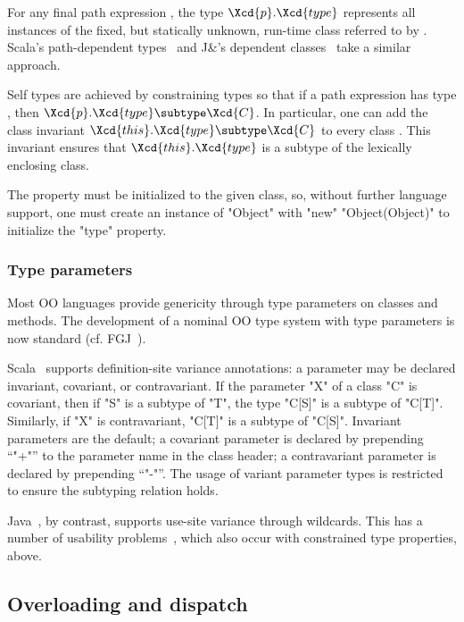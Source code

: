 \noindent
For any final path expression , the type
$\Xcd{p}.\Xcd{type}$ represents all instances of the fixed,
but statically unknown, run-time class referred to by .
Scala's path-dependent types~\cite{scala-book} and J\&'s
dependent classes~\cite{nqm06}
take a similar approach.

Self types are achieved by
constraining types so that if a path expression 
has type , then
$\Xcd{p}.\Xcd{type} \subtype \Xcd{C}$.
In particular, one can add the class invariant
$\Xcd{this}.\Xcd{type} \subtype \Xcd{C}$ to every class .
This invariant ensures that
$\Xcd{this}.\Xcd{type}$ is a subtype
of the lexically enclosing class.

The property must be initialized to the given class, so, without
further language support, one must create an instance of
\xcd"Object" with \xcd"new" \xcd"Object(Object)" to initialize
the \xcd"type" property.

\subsubsection{Type parameters}

Most OO languages provide genericity through type parameters on
classes and methods.  The development of a nominal OO type
system with type parameters is now standard (cf.  FGJ~\cite{FJ}).

Scala~\cite{scala} supports definition-site variance
annotations:
a parameter may be declared invariant, covariant, or
contravariant.
If the parameter \xcd"X" of a class \xcd"C" is covariant,
then if \xcd"S" is a subtype of
\xcd"T", the type \xcd"C[S]" is a subtype of \xcd"C[T]".
Similarly, if \xcd"X" is contravariant,
\xcd"C[T]" is a subtype of \xcd"C[S]".
Invariant parameters are the default; a covariant parameter is
declared by prepending ``\xcd"+"'' to the parameter name in the
class header; a contravariant parameter is declared by
prepending ``\xcd"-"''.  The usage of variant parameter types is
restricted to ensure the subtyping relation holds.

Java~\cite{Java3}, by contrast, supports use-site variance through wildcards.
This has a number of usability problems~\cite{wildcards-are-evil},
which also occur with constrained type properties, above.

\subsection{Overloading and dispatch}

